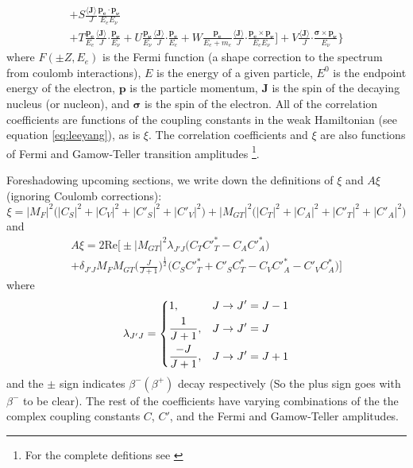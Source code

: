\begin{multline}
    + S\frac{\langle \boldsymbol{J} \rangle}{J} \frac{\boldsymbol{p_e\cdot p_\nu}}{E_e E_\nu} \\
    + T\frac{\boldsymbol{p_e}}{E_e}\frac{\langle \boldsymbol{J} \rangle}{J} \boldsymbol{\cdot} \frac{\boldsymbol{p_\nu}}{E_\nu}
    + U\frac{\boldsymbol{p_\nu}}{E_\nu}\frac{\langle \boldsymbol{J} \rangle}{J} \boldsymbol{\cdot} \frac{\boldsymbol{p_e}}{E_e}
    + W\frac{\boldsymbol{p_e}}{E_e+m_e}\frac{\langle \boldsymbol{J} \rangle}{J} \boldsymbol{\cdot} \frac{\boldsymbol{p_e \times p_\nu}}{E_e E_\nu}
    \Bigg]
  + V\frac{\langle \boldsymbol{J} \rangle}{J} \boldsymbol{\cdot} \frac{\boldsymbol{\sigma \times p_\nu}}{E_\nu}
  \Bigg\}
  \label{eq:jackson}
\end{multline}
%
where $F(\pm Z, E_e)$ is the Fermi function (a shape correction to the spectrum
from coulomb interactions), $E$ is the energy of a given particle, $E^0$ is the endpoint
energy of the electron, $\boldsymbol{p}$ is the particle momentum, $\boldsymbol{J}$ is the spin of the
decaying nucleus (or nucleon), and $\boldsymbol{\sigma}$ is the spin of the electron. All of the correlation coefficients
are functions of the coupling constants in the weak Hamiltonian (see equation \ref{eq:leeyang}),
as is $\xi$. The correlation coefficients and $\xi$ are also functions of Fermi and Gamow-Teller
transition amplitudes \footnote{For the complete defitions see \cite{jackson1957a,jackson1957b,ebel1957}}.

Foreshadowing upcoming sections, we write down the definitions of $\xi$ and $A\xi$ (ignoring Coulomb
corrections):
%
\begin{equation}
  \xi = |M_F|^2\big(|C_S|^2+|C_V|^2+|C'_S|^2+|C'_V|^2\big)+|M_{GT}|^2\big(|C_T|^2+|C_A|^2+|C'_T|^2+|C'_A|^2\big)
  \label{eq:xi}
\end{equation}
%
and
\begin{multline}
  A\xi = 2\mathrm{Re}\bigg[\pm |M_{GT}|^2 \lambda_{J'J}\big(C_TC'^*_T-C_AC'^*_A \big) \\
    + \delta_{J'J}M_FM_{GT}\bigg( \frac{J}{J+1} \bigg)^{\frac{1}{2}}\big(C_SC'^*_T+C'_SC^*_T -C_VC'^*_A-C'_VC^*_A \big) \bigg]
  \label{eq:XiA}
\end{multline}
where
\begin{equation}
\lambda_{J'J} =
\begin{dcases}
  1, & J\rightarrow J'=J-1 \\
  \frac{1}{J+1}, &  J\rightarrow J'=J \\
  \frac{-J}{J+1}, &  J\rightarrow J'=J+1 \\
\end{dcases}
\end{equation}
and the $\pm$ sign indicates $\beta^-(\beta^+)$ decay respectively (So the plus sign goes with
$\beta^-$ to be clear).
The rest of the coefficients have varying combinations of the the complex coupling
constants $C$, $C'$, and the Fermi and
Gamow-Teller amplitudes.

